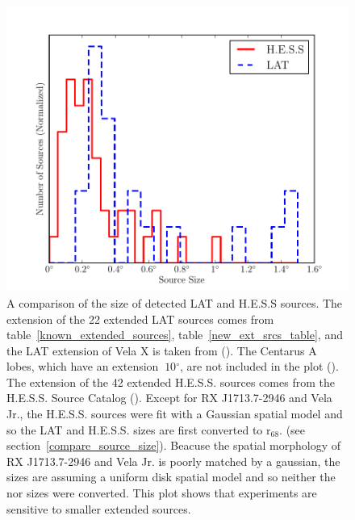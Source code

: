 \documentclass[12pt,preprint]{aastex}
\newcommand{\gev}{\text{GeV}\xspace}
\newcommand{\tev}{\text{TeV}\xspace}
\newcommand{\rsixeight}{{\ensuremath{\text{r}_{68}}}\xspace}
\renewcommand{\deg}{\ensuremath{^\circ}\xspace}
\begin{document}
\clearpage
\begin{figure}
  \begin{center}
    \includegraphics{summary_plots/gev_vs_tev_histogram.pdf}
    \end{center}
    \caption{
    A comparison of the size of detected LAT and H.E.S.S sources.
    The extension of the 22 extended LAT sources comes from
    table~\ref{known_extended_sources}, table~\ref{new_ext_srcs_table},
    and the LAT extension of Vela X is taken from (\cite{velax}). The
    Centarus A lobes, which have an extension $~10\deg$, are not
    included in the plot (\cite{cen_a_lat}).  The \tev extension of
    the 42 extended H.E.S.S. sources comes from the H.E.S.S. Source
    Catalog (\cite{hesscat}).  Except for RX J1713.7-2946 and Vela Jr.,
    the H.E.S.S. sources were fit with a Gaussian spatial model and
    so the LAT and H.E.S.S. sizes are first converted to \rsixeight.
    (see section~\ref{compare_source_size}). Beacuse the spatial
    morphology of RX J1713.7-2946 and Vela Jr. is poorly matched by a
    gaussian, the \tev sizes are assuming a uniform disk spatial model
    and so neither the \gev nor \tev sizes were converted.  This plot
    shows that \tev experiments are sensitive to smaller extended sources.
    }\label{gev_vs_tev_histogram}
  \end{figure}
\end{document}
